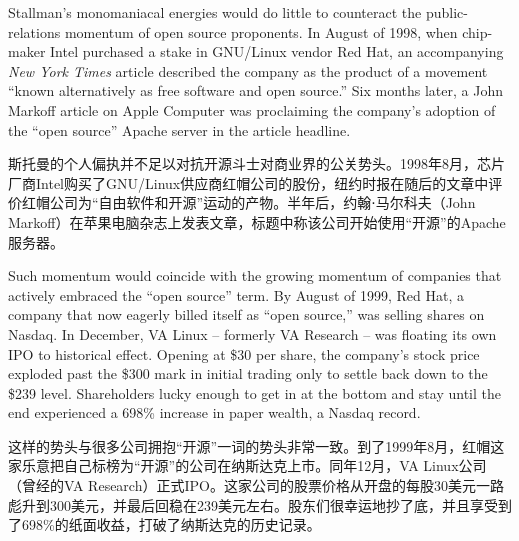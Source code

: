 \ifdefined\eng
Stallman's monomaniacal energies would do little to counteract the public-relations momentum of open source proponents. In August of 1998, when chip-maker Intel purchased a stake in GNU/Linux vendor Red Hat, an accompanying \textit{New York Times} article described the company as the product of a movement ``known alternatively as free software and open source.'' Six months later, a John Markoff article on Apple Computer was proclaiming the company's adoption of the ``open source'' Apache server in the article headline.
\fi

\ifdefined\chs
斯托曼的个人偏执并不足以对抗开源斗士对商业界的公关势头。1998年8月，芯片厂商Intel购买了GNU/Linux供应商红帽公司的股份，纽约时报在随后的文章中评价红帽公司为``自由软件和开源''运动的产物。半年后，约翰⋅马尔科夫（John Markoff）在苹果电脑杂志上发表文章，标题中称该公司开始使用``开源''的Apache服务器。
\fi

\ifdefined\eng
Such momentum would coincide with the growing momentum of companies that actively embraced the ``open source'' term. By August of 1999, Red Hat, a company that now eagerly billed itself as ``open source,'' was selling shares on Nasdaq. In December, VA Linux -- formerly VA Research -- was floating its own IPO to historical effect. Opening at \$30 per share, the company's stock price exploded past the \$300 mark in initial trading only to settle back down to the \$239 level. Shareholders lucky enough to get in at the bottom and stay until the end experienced a 698\% increase in paper wealth, a Nasdaq record.
\fi

\ifdefined\chs
这样的势头与很多公司拥抱``开源''一词的势头非常一致。到了1999年8月，红帽这家乐意把自己标榜为``开源''的公司在纳斯达克上市。同年12月，VA Linux公司（曾经的VA Research）正式IPO。这家公司的股票价格从开盘的每股30美元一路彪升到300美元，并最后回稳在239美元左右。股东们很幸运地抄了底，并且享受到了698\%的纸面收益，打破了纳斯达克的历史记录。
\fi

